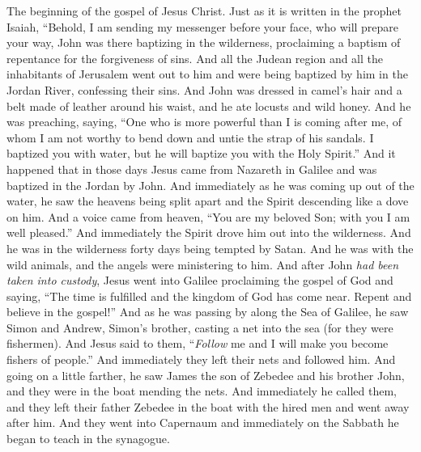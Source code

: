 
\begin{biblechapter} %
 The beginning of the gospel of Jesus Christ.
\verse Just as it is written in the prophet Isaiah,
\verse “Behold, I am sending my messenger before your face, 
who will prepare your way,
\verse John was there baptizing in the wilderness, proclaiming a baptism of repentance for the forgiveness of sins.
\verse And all the Judean region and all the inhabitants of Jerusalem went out to him and were being baptized by him in the Jordan River, confessing their sins.
\verse And John was dressed in camel’s hair and a belt made of leather around his waist, and he ate locusts and wild honey.
\verse And he was preaching, saying, “One who is more powerful than I is coming after me, of whom I am not worthy to bend down and untie the strap of his sandals.
\verse I baptized you with water, but he will baptize you with the Holy Spirit.”
 And it happened that in those days Jesus came from Nazareth in Galilee and was baptized in the Jordan by John.
\verse And immediately as he was coming up out of the water, he saw the heavens being split apart and the Spirit descending like a dove on him.
\verse And a voice came from heaven, “You are my beloved Son; with you I am well pleased.”
 And immediately the Spirit drove him out into the wilderness.
\verse And he was in the wilderness forty days being tempted by Satan. And he was with the wild animals, and the angels were ministering to him.
 And after John \textit{had been taken into custody}, Jesus went into Galilee proclaiming the gospel of God
\verse and saying, “The time is fulfilled and the kingdom of God has come near. Repent and believe in the gospel!”
 And as he was passing by along the Sea of Galilee, he saw Simon and Andrew, Simon’s brother, casting a net into the sea (for they were fishermen).
\verse And Jesus said to them, “\textit{Follow} me and I will make you become fishers of people.”
\verse And immediately they left their nets and followed him.
\verse And going on a little farther, he saw James the son of Zebedee and his brother John, and they were in the boat mending the nets.
\verse And immediately he called them, and they left their father Zebedee in the boat with the hired men and went away after him.
\verse And they went into Capernaum and immediately on the Sabbath he began to teach in the synagogue.

\end{biblechapter}
